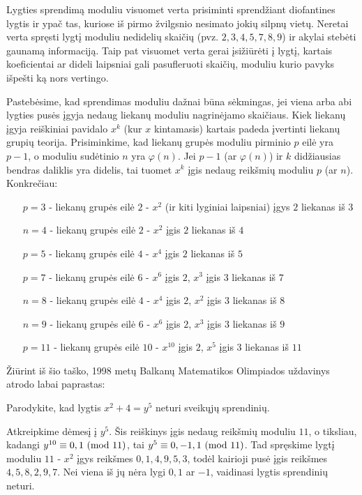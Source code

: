 Lygties sprendimą moduliu visuomet verta prisiminti sprendžiant diofantines
lygtis ir ypač tas, kuriose iš pirmo žvilgsnio nesimato jokių silpnų vietų.
Neretai verta spręsti lygtį moduliu nedidelių skaičių (pvz. $2, 3, 4, 5, 7,
8, 9$) ir akylai stebėti gaunamą informaciją. Taip pat visuomet verta gerai
įsižiūrėti į lygtį, kartais koeficientai ar dideli laipsniai gali
pasufleruoti skaičių, moduliu kurio pavyks išpešti ką nors vertingo. 

Pastebėsime, kad sprendimas moduliu dažnai būna sėkmingas, jei viena arba
abi lygties pusės įgyja nedaug liekanų moduliu nagrinėjamo skaičiaus. Kiek
liekanų įgyja reiškiniai pavidalo $x^k$ (kur $x$ kintamasis) kartais padeda
įvertinti liekanų grupių teorija. Prisiminkime, kad liekanų grupės moduliu
pirminio $p$ eilė yra $p-1$, o moduliu sudėtinio $n$ yra $\varphi(n)$. Jei
$p-1$ (ar $\varphi(n)$) ir $k$ didžiausias bendras daliklis yra didelis, tai
tuomet $x^k$ įgis nedaug reikšmių moduliu $p$ (ar $n$). Konkrečiau:

\begin{itemize}
  \item[$p=3$ -] liekanų grupės eilė $2$ - $x^2$ (ir kiti lyginiai
    laipsniai) įgys $2$ liekanas iš $3$ 
  \item[$n=4$ -] liekanų grupės eilė $2$ - $x^2$ įgis $2$ liekanas iš $4$
  \item[$p=5$ -] liekanų grupės eilė $4$ - $x^4$ įgis $2$ liekanas iš $5$
  \item[$p=7$ -] liekanų grupės eilė $6$ - $x^6$ įgis $2$, $x^3$ įgis $3$ liekanas iš $7$
  \item[$n=8$ -] liekanų grupės eilė $4$ - $x^4$ įgis $2$, $x^2$ įgis $3$ liekanas iš $8$
  \item[$n=9$ -] liekanų grupės eilė $6$ - $x^6$ įgis $2$, $x^3$ įgis $3$ liekanas iš $9$
  \item[$p=11$ -] liekanų grupės eilė $10$ - $x^{10}$ įgis $2$, $x^5$ įgis $3$ liekanas iš $11$
\end{itemize}

Žiūrint iš šio taško, 1998 metų Balkanų Matematikos Olimpiados uždavinys
atrodo labai paprastas:
\begin{pav} \text{\emph{[BMO 1998]}} Parodykite, kad lygtis $x^2 + 4 = y^5$ neturi
  sveikųjų sprendinių.
\end{pav}

\begin{sprendimas}
  Atkreipkime dėmesį į $y^5$. Šis reiškinys įgis nedaug reikšmių moduliu
  $11$, o tiksliau, kadangi $y^{10} \equiv 0,1 \ (\text{mod } 11)$, tai $y^5 \equiv 0,
  -1, 1 \ (\text{mod } 11)$. Tad spręskime lygtį moduliu $11$ - $x^2$ įgys reikšmes
  $0, 1, 4, 9, 5, 3$, todėl kairioji pusė įgis reikšmes $4, 5, 8, 2, 9, 7$.
  Nei viena iš jų nėra lygi $0, 1$ ar $-1$, vaidinasi lygtis sprendinių
  neturi.
\end{sprendimas}

